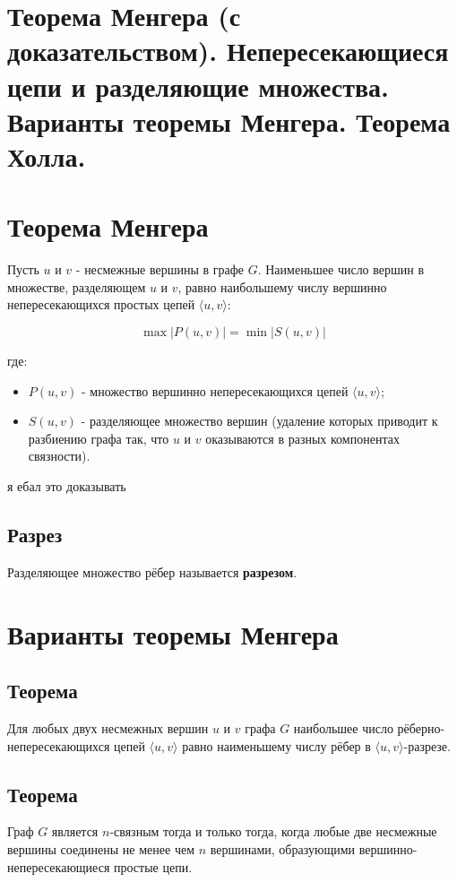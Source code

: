 {
	\section{Теорема Менгера (с доказательством). Непересекающиеся цепи и разделяющие
множества. Варианты теоремы Менгера. Теорема Холла.}

\section*{Теорема Менгера}

Пусть $u$ и $v$ - несмежные вершины в графе $G$.  
Наименьшее число вершин в множестве, разделяющем $u$ и $v$, равно наибольшему числу вершинно непересекающихся простых цепей $\langle u, v \rangle$:



\[
\max |P(u, v)| = \min |S(u, v)|
\]



где:
\begin{itemize}
  \item $P(u, v)$ - множество вершинно непересекающихся цепей $\langle u, v \rangle$;
  \item $S(u, v)$ - разделяющее множество вершин (удаление которых приводит к разбиению графа так, что $u$ и $v$ оказываются в разных компонентах связности).
\end{itemize}

я ебал это доказывать

\subsection*{Разрез}
Разделяющее множество рёбер называется \textbf{разрезом}.

\section*{Варианты теоремы Менгера}

\subsection*{Теорема}
Для любых двух несмежных вершин $u$ и $v$ графа $G$ наибольшее число рёберно-непересекающихся цепей $\langle u, v \rangle$ равно наименьшему числу рёбер в $\langle u, v \rangle$-разрезе.

\subsection*{Теорема}
Граф $G$ является $n$-связным тогда и только тогда, когда любые две несмежные вершины соединены не менее чем $n$ вершинами, образующими вершинно-непересекающиеся простые цепи.

}
